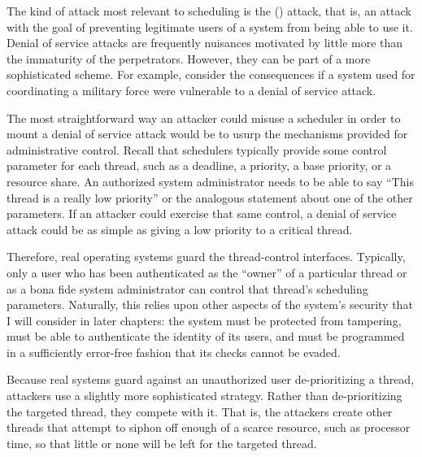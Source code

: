 The kind of attack most relevant to
scheduling is the  () attack, that is, an
attack with the goal of preventing legitimate users of a system from
being able to use it.  Denial of service attacks are frequently
nuisances motivated by little more than the immaturity of the
perpetrators.  However, they can be part of a more sophisticated
scheme.  For example, consider the consequences if a system used for
coordinating a military force were vulnerable to a denial of service
attack.

The most straightforward way an attacker could misuse a scheduler in
order to mount a denial of service attack would be to usurp the
mechanisms provided for administrative control.  Recall that
schedulers typically provide some control parameter for each thread,
such as a deadline, a priority, a base priority, or a resource share.
An authorized system administrator needs to be able to say ``This
thread is a really low priority'' or the analogous statement about
one of the other parameters.  If an attacker could exercise that same
control, a denial of service attack could be as simple as giving a low
priority to a critical thread.

Therefore, real operating systems guard the thread-control interfaces.
Typically, only a user who has been authenticated as the ``owner'' of
a particular thread or as a bona fide system administrator can control
that thread's scheduling parameters.  Naturally, this relies upon
other aspects of the system's security that I will consider in later
chapters: the system must be protected from tampering, must be able to
authenticate the identity of its users, and must be programmed in a
sufficiently error-free fashion that its checks cannot be evaded.

Because real systems guard against an unauthorized user
de-prioritizing a thread, attackers use a slightly more sophisticated
strategy.  Rather than de-prioritizing the targeted thread, they
compete with it.  That is, the attackers create other threads that
attempt to siphon off enough of a scarce resource, such as processor
time, so that little or none will be left for the targeted thread.

